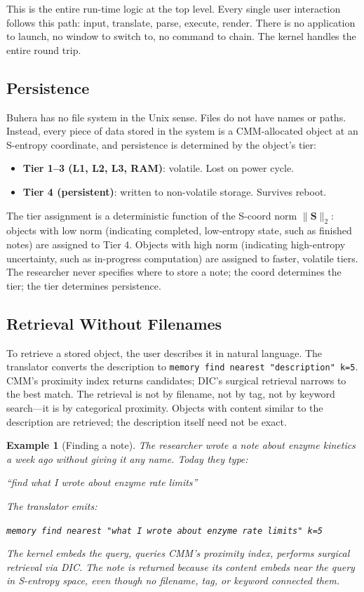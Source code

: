 \documentclass[11pt,twocolumn,a4paper]{article}
\newtheorem{example}[theorem]{Example}
\newcommand{\Scoord}{\mathbf{S}}
\begin{document}
This is the entire run-time logic at the top level. Every single user interaction follows this path: input, translate, parse, execute, render. There is no application to launch, no window to switch to, no command to chain. The kernel handles the entire round trip.

\subsection{Persistence}

Buhera has no file system in the Unix sense. Files do not have names or paths. Instead, every piece of data stored in the system is a CMM-allocated object at an S-entropy coordinate, and persistence is determined by the object's tier:

\begin{itemize}[leftmargin=*]
\item \textbf{Tier 1--3 (L1, L2, L3, RAM)}: volatile. Lost on power cycle.
\item \textbf{Tier 4 (persistent)}: written to non-volatile storage. Survives reboot.
\end{itemize}

The tier assignment is a deterministic function of the S-coord norm $\|\Scoord\|_2$: objects with low norm (indicating completed, low-entropy state, such as finished notes) are assigned to Tier 4. Objects with high norm (indicating high-entropy uncertainty, such as in-progress computation) are assigned to faster, volatile tiers. The researcher never specifies where to store a note; the coord determines the tier; the tier determines persistence.

\subsection{Retrieval Without Filenames}

To retrieve a stored object, the user describes it in natural language. The translator converts the description to \texttt{memory find nearest "description" k=5}. CMM's proximity index returns candidates; DIC's surgical retrieval narrows to the best match. The retrieval is not by filename, not by tag, not by keyword search---it is by categorical proximity. Objects with content similar to the description are retrieved; the description itself need not be exact.

\begin{example}[Finding a note]
The researcher wrote a note about enzyme kinetics a week ago without giving it any name. Today they type:
\begin{center}
\textit{``find what I wrote about enzyme rate limits''}
\end{center}
The translator emits:
\begin{center}
\texttt{memory find nearest "what I wrote about enzyme rate limits" k=5}
\end{center}
The kernel embeds the query, queries CMM's proximity index, performs surgical retrieval via DIC. The note is returned because its content embeds near the query in S-entropy space, even though no filename, tag, or keyword connected them.
\end{example}
\end{document}
